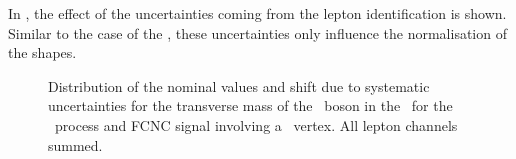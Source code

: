 In , the effect of the uncertainties coming from the lepton identification is shown. Similar to the case of the \WZCR, these uncertainties only influence the normalisation of the shapes. 
\begin{figure}[htbp] 
\centering 
	\caption{Distribution of the nominal values and shift due to systematic uncertainties for the transverse mass of the \PW\ boson in the \STSR\ for the \WZ\ process and FCNC signal involving a \Zut\ vertex. All lepton channels summed. }
\label{fig:shiftBDTSTZut0}
\end{figure}

